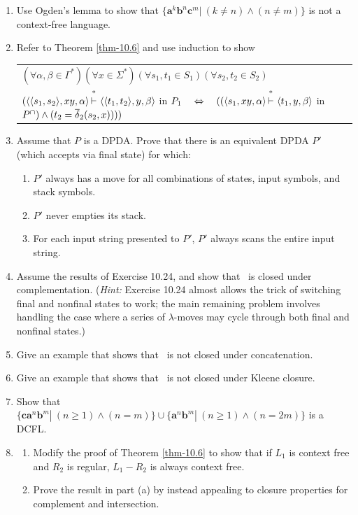 \begin{enumerate}[{10.}1.]
\item Use Ogden's lemma to show that $\{\pmb{a}^k\pmb{b}^n\pmb{c}^m|\ (k\not=n)
\wedge(n\not=m)\}$ is not a context-free language.

\item Refer to Theorem \ref{thm-10.6} and use induction to show
\begin{center}\begin{tabular}{l}
$(\forall\alpha,\beta\in\Gamma^*)(\forall x\in\Sigma^*)(\forall s_1,t_1\in S_1)
	(\forall s_2,t_2\in S_2)$ \\
$(\langle\langle s_1,s_2\rangle,xy,\alpha\rangle\Dvdash\langle\langle t_1,t_2
	\rangle,y,\beta\rangle$ in $P_1\ \ \ \Leftrightarrow\ \ \ ((\langle s_1,xy,\alpha
	\rangle\Dvdash\langle t_1,y,\beta\rangle$ in $P^{\cap})\wedge(t_2=
	\overline{\delta}_2(s_2,x))))$
\end{tabular}\end{center}

\item Assume that $P$ is a DPDA. Prove that there is an equivalent DPDA $P'$
(which accepts via final state) for which:
\begin{enumerate}
\item $P'$ always has a move for all combinations of states, input symbols, and
stack symbols.
\item $P'$ never empties its stack.
\item For each input string presented to $P'$, $P'$ always scans the entire
input string.
\end{enumerate}

\item Assume the results of Exercise 10.24, and show that \ASIG\ is closed under
complementation. (\emph{Hint:} Exercise 10.24 almost allows the trick of
switching final and nonfinal states to work; the main remaining problem involves
handling the case where a series of $\lambda$-moves may cycle through both final
and nonfinal states.)

\item Give an example that shows that \ASIG\ is not closed under concatenation.

\item Give an example that shows that \ASIG\ is not closed under Kleene closure.

\item Show that $\{\pmb{ca}^n\pmb{b}^m|\ (n\geq 1)\wedge(n=m)\}\cup\{\pmb{a}^n
\pmb{b}^m|\ (n\geq 1)\wedge(n=2m)\}$ is a DCFL.

\item \begin{enumerate}
\item Modify the proof of Theorem \ref{thm-10.6} to show that if $L_1$ is context free and
$R_2$ is regular, $L_1-R_2$ is always context free.
\item Prove the result in part (a) by instead appealing to closure properties
for complement and intersection.
\end{enumerate}


\end{enumerate}
